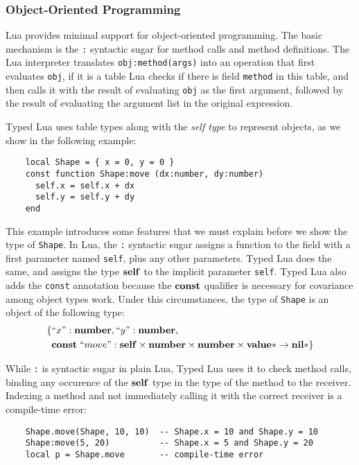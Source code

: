 \subsubsection{Object-Oriented Programming}

Lua provides minimal support for object-oriented programming.
The basic mechanism is the \texttt{:} syntactic sugar for method
calls and method definitions.
The Lua interpreter translates \texttt{obj:method(args)} into
an operation that first evaluates \texttt{obj}, if it is a table
Lua checks if there is field \texttt{method} in this table,
and then calls it with the result of evaluating \texttt{obj} as
the first argument, followed by the result of evaluating the
argument list in the original expression.

Typed Lua uses table types along with the \emph{self type} to
represent objects, as we show in the following example:
\begin{verbatim}
    local Shape = { x = 0, y = 0 }
    const function Shape:move (dx:number, dy:number)
      self.x = self.x + dx
      self.y = self.y + dy
    end
\end{verbatim}

This example introduces some features that we must explain
before we show the type of \texttt{Shape}.
In Lua, the \texttt{:} syntactic sugar assigns a function to the
field with a first parameter named \texttt{self}, plus any other
parameters.
Typed Lua does the same, and assigns the type $\mathbf{self}$ to the
implicit parameter \texttt{self}.
Typed Lua also adds the \texttt{const} annotation because the
$\mathbf{const}$ qualifier is necessary for covariance among object types work.
Under this circumstances, the type of \texttt{Shape} is an object of
the following type:
\begin{align*}
\{ & ``x":\mathbf{number}, ``y":\mathbf{number}, \\
& \mathbf{const} \; ``move":\mathbf{self} \times \mathbf{number} \times \mathbf{number} \times \mathbf{value}{*} \rightarrow \mathbf{nil}{*}\}
\end{align*}

While \texttt{:} is syntactic sugar in plain Lua, Typed Lua uses it
to check method calls, binding any occurence of the $\mathbf{self}$ type
in the type of the method to the receiver.
Indexing a method and not immediately calling it with the correct
receiver is a compile-time error:
\begin{verbatim}
    Shape.move(Shape, 10, 10)  -- Shape.x = 10 and Shape.y = 10
    Shape:move(5, 20)          -- Shape.x = 5 and Shape.y = 20
    local p = Shape.move       -- compile-time error
\end{verbatim}

